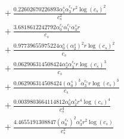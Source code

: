 \documentclass[10pt]{article}
\begin{document}
\begin{align*}
&{}  + \frac{0.22602670226893 \alpha_{1}^s \alpha_{3}^{c_s} r^{2} \log{\left(c_{s} \right)}^{2}}{c_{s}^{2}} \\
&{}  + \frac{3.6818612242792 \alpha_{0}^{c_s} \alpha_{1}^{c_s} \alpha_{3}^s r}{c_{s}} \\
&{}  + \frac{0.97739655975224 \alpha_{0}^s \left(\alpha_{2}^s\right)^{2} r \log{\left(c_{s} \right)}^{2}}{c_{s}} \\
&{}  + \frac{0.062906314508424 \alpha_{2}^s \alpha_{3}^{c_s} r \log{\left(c_{s} \right)}^{3}}{c_{s}} \\
&{}  + \frac{0.062906314508424 \left(\alpha_{0}^s\right)^{3} \alpha_{3}^{c_s} r \log{\left(c_{s} \right)}^{3}}{c_{s}} \\
&{}  + \frac{0.0039803664114812 \alpha_{0}^s \alpha_{2}^s r^{4} \log{\left(c_{s} \right)}^{4}}{c_{s}^{4}} \\
&{}  + \frac{4.4655191308847 \left(\alpha_{0}^{c_s}\right)^{2} \alpha_{3}^s r^{2} \log{\left(c_{s} \right)}}{c_{s}^{2}}
\end{align*}
\end{document}
